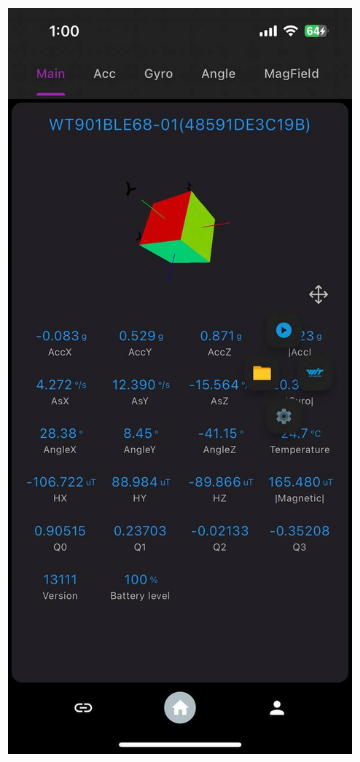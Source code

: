 \documentclass[12pt]{report}
\begin{document}
\begin{figure}[h]
\begin{subfigure}[b]{0.24\textwidth}
    \end{subfigure}
    \begin{subfigure}[b]{0.24\textwidth}
        \centering
        \includegraphics[width=\textwidth]{witmotion-app-interface-accelerometer-overview-screen}

\end{subfigure}
\end{figure}
\end{document}
